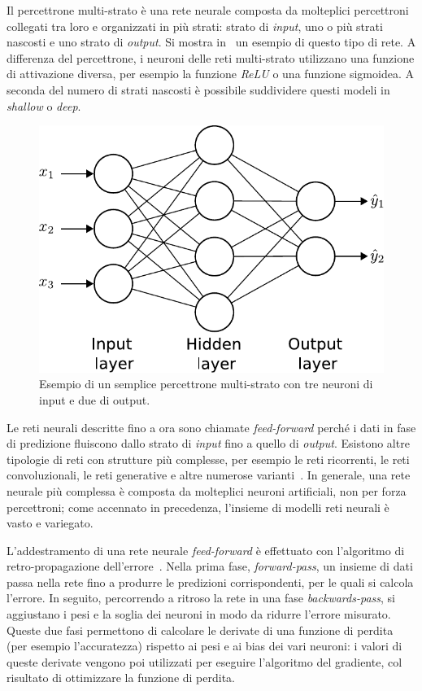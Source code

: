 Il percettrone multi-strato è una rete neurale composta da molteplici percettroni collegati tra loro e organizzati in più strati: strato di \emph{input}, uno o più strati nascosti e uno strato di \emph{output}. Si mostra in~ un esempio di questo tipo di rete. 
A differenza del percettrone, i neuroni delle reti multi-strato utilizzano una funzione di attivazione 
diversa, per esempio la funzione \emph{ReLU} o una funzione sigmoidea.
A seconda del numero di strati nascosti è possibile suddividere questi modeli in \emph{shallow} o \emph{deep}.
\begin{figure}
    \centering
    \includegraphics[width=0.5\linewidth]{img/nn.pdf}
    \caption{Esempio di un semplice percettrone multi-strato con tre neuroni di input e due di output.}
    \label{fig:NN}
\end{figure}
Le reti neurali descritte fino a ora sono chiamate \emph{feed-forward} perché i dati in fase di predizione fluiscono dallo strato di \emph{input} fino a quello di \emph{output}.
Esistono altre tipologie di reti con strutture più complesse, per esempio le reti ricorrenti, le reti convoluzionali, le reti generative e altre numerose varianti~\cite{aggarwal2018neural}.
In generale, una rete neurale più complessa è composta da molteplici neuroni artificiali, non per forza percettroni; come accennato in precedenza, l'insieme di modelli reti neurali è vasto e variegato.

L'addestramento di una rete neurale \emph{feed-forward} è effettuato con l'algoritmo di retro-propagazione dell'errore~\cite{neural_networks}.
Nella prima fase, \emph{forward-pass}, un insieme di dati passa nella rete fino a produrre le predizioni corrispondenti, per le quali si calcola l'errore. In seguito, percorrendo a ritroso la rete in una fase \emph{backwards-pass}, si aggiustano i pesi e la soglia dei neuroni in modo da ridurre l'errore misurato.
Queste due fasi permettono di calcolare le derivate di una funzione di perdita (per esempio l'accuratezza) rispetto ai pesi e ai bias dei vari neuroni: i valori di queste derivate vengono poi utilizzati per eseguire l'algoritmo del gradiente, col risultato di ottimizzare la funzione di perdita.


